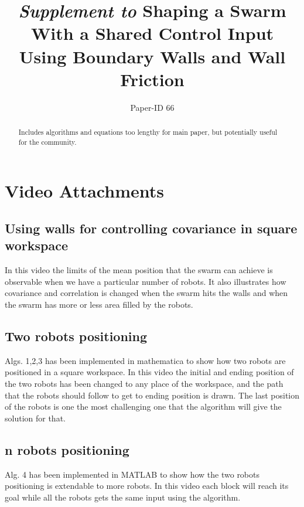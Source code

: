 \documentclass[conference]{IEEEtran}
\begin{document}
\title{\large{ \emph{Supplement to} 
Shaping a Swarm With a Shared Control Input\\ Using Boundary Walls and Wall Friction}}

\author{Paper-ID 66}


\maketitle

\begin{abstract}
Includes algorithms and equations too lengthy for main paper, but potentially useful for the community.
\end{abstract}

\IEEEpeerreviewmaketitle

\section{Video Attachments}

\subsection{Using walls for controlling covariance in square workspace}
In this video the limits of the mean position that the swarm can achieve is observable when we have a particular number of robots. It also illustrates how covariance and correlation is changed when the swarm hits the walls and when the swarm has more or less area filled by the robots.
\subsection{Two robots positioning}
Algs. 1,2,3 has been implemented in mathematica to show how two robots are positioned in a square workspace. In this video the initial and ending position of the two robots has been changed to any place of the workspace, and the path that the robots should follow to get to ending position is drawn. The last position of the robots is one the most challenging one that the algorithm will give the solution for that.
\subsection{n robots positioning}
Alg. 4 has been implemented in MATLAB to show how the two robots positioning is extendable to more robots. In this video each block will reach its goal while all the robots gets the same input using the algorithm.
\end{document}
